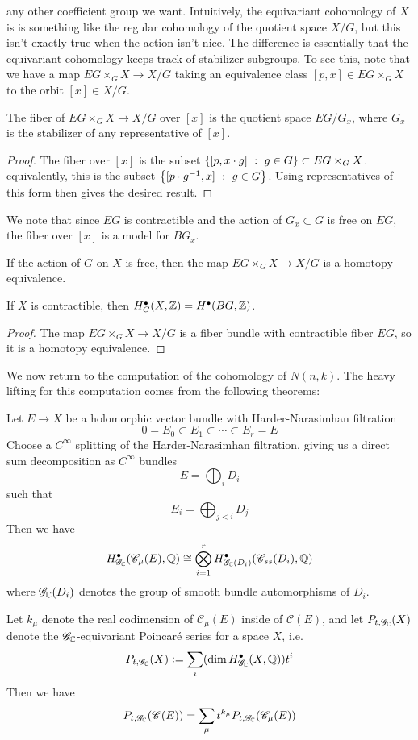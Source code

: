 any other coefficient group we want. Intuitively, the equivariant cohomology of
$X$ is is something like the regular cohomology of the quotient space $X/G$, but
this isn't exactly true when the action isn't nice. The difference is essentially
that the equivariant cohomology keeps track of stabilizer subgroups. To
see this, note that we have a map $EG\times_G X \to X/G$ taking an
equivalence class $[p,x] \in EG\times_G X$ to the orbit $[x] \in X/G$.
%
\begin{prop}
The fiber of $EG\times_G X \to X/G$ over $[x]$ is the quotient space $EG/G_x$, where
$G_x$ is the stabilizer of any representative of $[x]$.
\end{prop}
%
\begin{proof}
The fiber over $[x]$ is the subset $\left\lbrace [p,x\cdot g] ~:~ g \in G \right\rbrace\subset EG \times_G X$.
equivalently, this is the subset $\left\lbrace [p\cdot g^{-1},x] ~:~ g \in G \right\rbrace$. Using
representatives of this form then gives the desired result.
\end{proof}
%
We note that since $EG$ is contractible and the action of $G_x \subset G$
is free on $EG$, the fiber over $[x]$ is a model for $BG_x$.
%
\begin{cor}
If the action of $G$ on $X$ is free, then the map $EG\times_G X \to X/G$
is a homotopy equivalence.
\end{cor}
%
\begin{cor}
If $X$ is contractible, then $H^\bullet_G(X,\mathbb{Z}) = H^\bullet(BG,\mathbb{Z})$.
\end{cor}
%
\begin{proof}
The map $EG\times_G X \to X/G$ is a fiber bundle with contractible fiber $EG$, so it
is a homotopy equivalence.
\end{proof}
%
We now return to the computation of the cohomology of $N(n,k)$. The heavy
lifting for this computation comes from the following theorems:
%
\begin{thm}
Let $E \to X$ be a holomorphic vector bundle with Harder-Narasimhan filtration
\[
0 = E_0 \subset E_1 \subset \cdots \subset E_r = E
\]
Choose a $C^\infty$ splitting of the Harder-Narasimhan filtration, giving us a direct
sum decomposition as $C^\infty$ bundles
\[
E = \bigoplus_i D_i
\]
such that
\[
E_i = \bigoplus_{j < i} D_j
\]
Then we have
\[
H^\bullet_{\mathscr{G}_{\mathbb{C}}}(\mathscr{C}_\mu(E),\mathbb{Q}) \cong
\bigotimes_{i=1}^r H^\bullet_{\mathscr{G}_{\mathbb{C}}(D_i)}(\mathscr{C}_{ss}(D_i),\mathbb{Q})
\]
where $\mathscr{G}_{\mathbb{C}}(D_i)$ denotes the group of smooth bundle automorphisms of $D_i$.
\end{thm}
%
\begin{thm}
Let $k_\mu$ denote the real codimension of $\mathscr{C}_\mu(E)$ inside
of $\mathscr{C}(E)$, and let $P_{t,\mathscr{G}_{\mathbb{C}}}(X)$ denote the
$\mathscr{G}_{\mathbb{C}}$-equivariant Poincar\'e series for a space $X$, i.e.
\[
P_{t,\mathscr{G}_{\mathbb{C}}}(X) \vcentcolon= \sum_i (\dim H^\bullet_{\mathscr{G}_{\mathbb{C}}}(X,\mathbb{Q}))t^i
\]
Then we have
\[
P_{t,\mathscr{G}_{\mathbb{C}}}(\mathscr{C}(E))
= \sum_\mu t^{k_\mu}P_{t,\mathscr{G}_{\mathbb{C}}}(\mathscr{C}_\mu(E))
\]
\end{thm}
